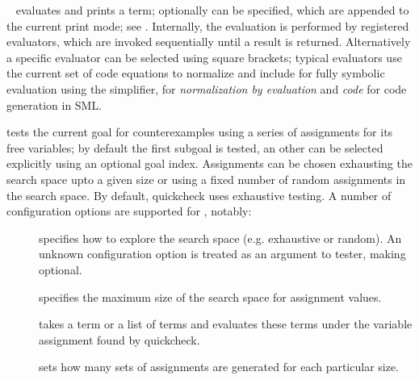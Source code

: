 \begin{isabellebody}
\begin{isamarkuptext}
  \begin{description}

  \item \hyperlink{command.HOL.value}{\mbox{}}~ evaluates and prints a
    term; optionally  can be specified, which are
    appended to the current print mode; see .
    Internally, the evaluation is performed by registered evaluators,
    which are invoked sequentially until a result is returned.
    Alternatively a specific evaluator can be selected using square
    brackets; typical evaluators use the current set of code equations
    to normalize and include  for fully symbolic
    evaluation using the simplifier,  for
    \emph{normalization by evaluation} and \emph{code} for code
    generation in SML.

  \item \hyperlink{command.HOL.quickcheck}{\mbox{}} tests the current goal for
    counterexamples using a series of assignments for its
    free variables; by default the first subgoal is tested, an other
    can be selected explicitly using an optional goal index.
    Assignments can be chosen exhausting the search space upto a given
    size or using a fixed number of random assignments in the search space.
    By default, quickcheck uses exhaustive testing.
    A number of configuration options are supported for
    \hyperlink{command.HOL.quickcheck}{\mbox{}}, notably:

    \begin{description}

    \item[] specifies how to explore the search space
      (e.g. exhaustive or random).
      An unknown configuration option is treated as an argument to tester,
      making  optional.
    \item[] specifies the maximum size of the search space
    for assignment values.

    \item[] takes a term or a list of terms and evaluates
      these terms under the variable assignment found by quickcheck.

    \item[] sets how many sets of assignments are
    generated for each particular size.


\end{description}
\end{description}
\end{isamarkuptext}
\end{isabellebody}

